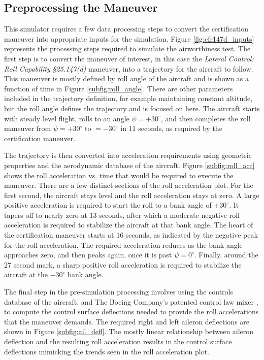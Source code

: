 \subsection{Preprocessing the Maneuver}

This simulator requires a few data processing steps to convert the certification maneuver into appropriate inputs for the simulation.
Figure \ref{fig:cfr147d_inputs} represents the processing steps required to simulate the airworthiness test. 
The first step is to convert the maneuver of interest, in this case the \textit{Lateral Control: Roll Capability \S 25.147(d)} maneuver, into a trajectory for the aircraft to follow. 
This maneuver is mostly defined by roll angle of the aircraft and is shown as a function of time in Figure \ref{subfig:roll_angle}.
There are other parameters included in the trajectory definition, for example maintaining constant altitude, but the roll angle defines the trajectory and is focused on here. 
The aircraft starts with steady level flight, rolls to an angle $\psi = +30^\circ$, and then completes the roll maneuver from $\psi = +30^\circ$ to $=-30^\circ$ in 11 seconds, as required by the certification maneuver. 

The trajectory is then converted into acceleration requirements using geometric properties and the aerodynamic database of the aircraft.
Figure \ref{subfig:roll_acc} shows the roll acceleration vs. time that would be required to execute the maneuver.
There are a few distinct sections of the roll acceleration plot. 
For the first second, the aircraft stays level and the roll acceleration stays at zero.
A large positive acceleration is required to start the roll to a bank angle of $+30^\circ$. 
It tapers off to nearly zero at $13$ seconds, after which a moderate negative roll acceleration is required to stabilize the aircraft at that bank angle. 
The heart of the certification maneuver starts at $16$ seconds, as indicated by the negative peak for the roll acceleration.
The required acceleration reduces as the bank angle approaches zero, and then peaks again, once it is past $\psi=0^\circ$.
Finally, around the $27$ second mark, a sharp positive roll acceleration is required to stabilize the aircraft at the $-30^\circ$ bank angle. 

The final step in the pre-simulation processing involves using the controls database of the aircraft, and The Boeing Company's patented control law mixer \cite{control_law_patent}, to compute the control surface deflections needed to provide the roll accelerations that the maneuver demands. 
The required right and left aileron deflections are shown in Figure \ref{subfig:ail_defl}.
The mostly linear relationship between aileron deflection and the resulting roll acceleration results in the control surface deflections mimicking the trends seen in the roll acceleration plot. 

